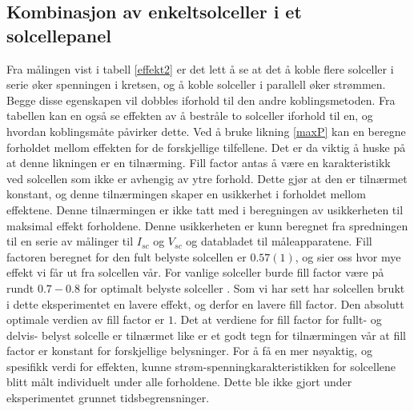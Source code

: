 \documentclass[%
 reprint,
 amsmath,amssymb,
 aps,
 norsk,
 booktabs
]{revtex4-1}
\begin{document}
\subsection{Kombinasjon av enkeltsolceller i et solcellepanel}
Fra målingen vist i tabell \vref{effekt2} er det lett å se at det å koble flere solceller i serie øker spenningen i kretsen, og å koble solceller i parallell øker strømmen. Begge disse egenskapen vil dobbles iforhold til den andre koblingsmetoden. Fra tabellen kan en også se effekten av å bestråle to solceller iforhold til en, og hvordan koblingsmåte påvirker dette. Ved å bruke likning \eqref{maxP} kan en beregne forholdet mellom effekten for de forskjellige tilfellene. Det er da viktig å huske på at denne likningen er en tilnærming. Fill factor antas å være en karakteristikk ved solcellen som ikke er avhengig av ytre forhold. Dette gjør at den er tilnærmet konstant, og denne tilnærmingen skaper en usikkerhet i forholdet mellom effektene. Denne tilnærmingen er ikke tatt med i beregningen av usikkerheten til maksimal effekt forholdene. Denne usikkerheten er kunn beregnet fra spredningen til en serie av målinger til $I_{sc}$ og $V_{sc}$ og databladet til måleapparatene. Fill factoren beregnet for den fult belyste solcellen er $0.57(1)$, og sier oss hvor mye effekt vi får ut fra solcellen vår. For vanlige solceller burde fill factor være på rundt $0.7-0.8$ for optimalt belyste solceller \cite{energy_alt}. Som vi har sett har solcellen brukt i dette eksperimentet en lavere effekt, og derfor en lavere fill factor. Den absolutt optimale verdien av fill factor er $1$. Det at verdiene for fill factor for fullt- og delvis- belyst solcelle er tilnærmet like er et godt tegn for tilnærmingen vår at fill factor er konstant for forskjellige belysninger. For å få en mer nøyaktig, og spesifikk verdi for effekten, kunne strøm-spenningkarakteristikken for solcellene blitt målt individuelt under alle forholdene. Dette ble ikke gjort under eksperimentet grunnet tidsbegrensninger.\par
\end{document}
